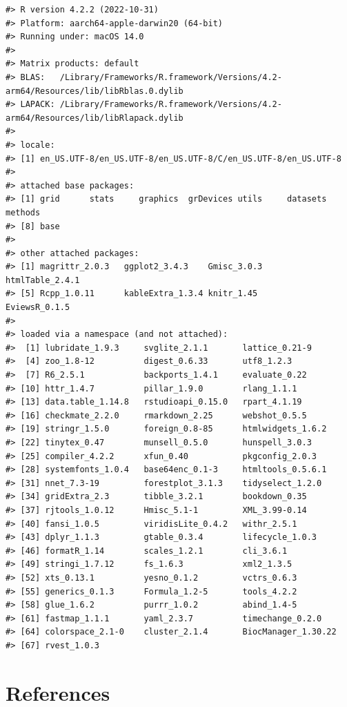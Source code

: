\begin{verbatim}
#> R version 4.2.2 (2022-10-31)
#> Platform: aarch64-apple-darwin20 (64-bit)
#> Running under: macOS 14.0
#> 
#> Matrix products: default
#> BLAS:   /Library/Frameworks/R.framework/Versions/4.2-arm64/Resources/lib/libRblas.0.dylib
#> LAPACK: /Library/Frameworks/R.framework/Versions/4.2-arm64/Resources/lib/libRlapack.dylib
#> 
#> locale:
#> [1] en_US.UTF-8/en_US.UTF-8/en_US.UTF-8/C/en_US.UTF-8/en_US.UTF-8
#> 
#> attached base packages:
#> [1] grid      stats     graphics  grDevices utils     datasets  methods  
#> [8] base     
#> 
#> other attached packages:
#> [1] magrittr_2.0.3   ggplot2_3.4.3    Gmisc_3.0.3      htmlTable_2.4.1 
#> [5] Rcpp_1.0.11      kableExtra_1.3.4 knitr_1.45       EviewsR_0.1.5   
#> 
#> loaded via a namespace (and not attached):
#>  [1] lubridate_1.9.3     svglite_2.1.1       lattice_0.21-9     
#>  [4] zoo_1.8-12          digest_0.6.33       utf8_1.2.3         
#>  [7] R6_2.5.1            backports_1.4.1     evaluate_0.22      
#> [10] httr_1.4.7          pillar_1.9.0        rlang_1.1.1        
#> [13] data.table_1.14.8   rstudioapi_0.15.0   rpart_4.1.19       
#> [16] checkmate_2.2.0     rmarkdown_2.25      webshot_0.5.5      
#> [19] stringr_1.5.0       foreign_0.8-85      htmlwidgets_1.6.2  
#> [22] tinytex_0.47        munsell_0.5.0       hunspell_3.0.3     
#> [25] compiler_4.2.2      xfun_0.40           pkgconfig_2.0.3    
#> [28] systemfonts_1.0.4   base64enc_0.1-3     htmltools_0.5.6.1  
#> [31] nnet_7.3-19         forestplot_3.1.3    tidyselect_1.2.0   
#> [34] gridExtra_2.3       tibble_3.2.1        bookdown_0.35      
#> [37] rjtools_1.0.12      Hmisc_5.1-1         XML_3.99-0.14      
#> [40] fansi_1.0.5         viridisLite_0.4.2   withr_2.5.1        
#> [43] dplyr_1.1.3         gtable_0.3.4        lifecycle_1.0.3    
#> [46] formatR_1.14        scales_1.2.1        cli_3.6.1          
#> [49] stringi_1.7.12      fs_1.6.3            xml2_1.3.5         
#> [52] xts_0.13.1          yesno_0.1.2         vctrs_0.6.3        
#> [55] generics_0.1.3      Formula_1.2-5       tools_4.2.2        
#> [58] glue_1.6.2          purrr_1.0.2         abind_1.4-5        
#> [61] fastmap_1.1.1       yaml_2.3.7          timechange_0.2.0   
#> [64] colorspace_2.1-0    cluster_2.1.4       BiocManager_1.30.22
#> [67] rvest_1.0.3
\end{verbatim}

\clearpage

\hypertarget{references}{%
\section*{References}\label{references}}

